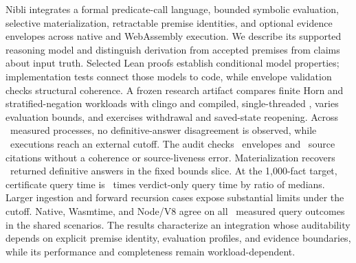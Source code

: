 Nibli integrates a formal predicate-call language, bounded symbolic evaluation,
selective materialization, retractable premise identities, and optional evidence
envelopes across native and WebAssembly execution. We describe its supported
reasoning model and distinguish derivation from accepted premises from claims
about input truth. Selected Lean proofs establish conditional model properties;
implementation tests connect those models to code, while envelope validation
checks structural coherence. A frozen research artifact compares finite Horn
and stratified-negation workloads with clingo and compiled, single-threaded
\Souffle, varies evaluation bounds, and exercises withdrawal and saved-state
reopening. Across \MeasuredRuns\ measured processes, no definitive-answer
disagreement is observed, while \TimeoutRuns\ executions reach an external
cutoff. The audit checks \CertificateCount\ envelopes and \CitationCount\ source
citations without a coherence or source-liveness error. Materialization recovers
\BoundsGains\ returned definitive answers in the fixed bounds slice. At the
1,000-fact target, certificate query time is \CertificateMedianRatio\ times
verdict-only query time by ratio of medians. Larger ingestion and forward
recursion cases expose substantial limits under the cutoff. Native, Wasmtime,
and Node/V8 agree on all \PortableAnswers\ measured query outcomes in the shared
scenarios. The results characterize an integration whose auditability depends
on explicit premise identity, evaluation profiles, and evidence boundaries,
while its performance and completeness remain workload-dependent.
